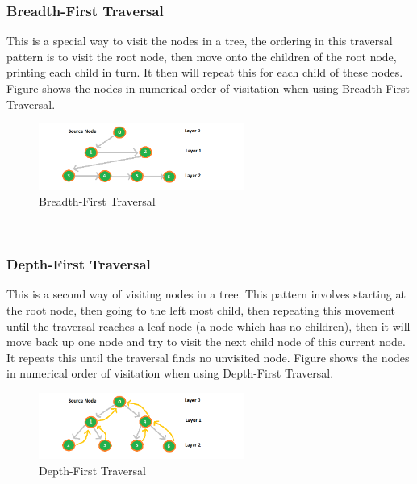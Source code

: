 \documentclass[10pt,twocolumn]{IEEEtran}
\begin{document}
\subsubsection{Breadth-First Traversal}
This is a special way to visit the nodes in a tree, the ordering in this traversal pattern is to visit the root node, then move onto the children of the root node, printing each child in turn. It then will repeat this for each child of these nodes. Figure \cite{fig:breadth} shows the nodes in numerical order of visitation when using Breadth-First Traversal. \\
\begin{figure}[h]
\includegraphics[width=0.6\textwidth]{bfs.png}
\caption{Breadth-First Traversal}
\label{fig:breadth}
\end{figure}
 \\
\subsubsection{Depth-First Traversal}
This is a second way of visiting nodes in a tree. This pattern involves starting at the root node, then going to the left most child, then repeating this movement until the traversal reaches a leaf node (a node which has no children), then it will move back up one node and try to visit the next child node of this current node. It repeats this until the traversal finds no unvisited node. Figure \cite{fig:depth} shows the nodes in numerical order of visitation when using Depth-First Traversal. 
\begin{figure}[h]
\includegraphics[width=0.6\textwidth]{dfs.png}
\caption{Depth-First Traversal}
\label{fig:depth}
\end{figure}
\end{document}

